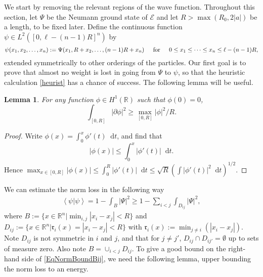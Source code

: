\documentclass[a4paper,11pt]{article}
\newcommand{\abs}[1]{\left\lvert #1 \right\rvert}
\renewcommand{\braket}[1]{\left\langle#1\right\rangle}
\newcommand*\diff{\mathop{}\!\mathrm{d}}
\newcommand{\R}{\mathbb{R}}
\newtheorem{lemma}[theorem]{Lemma}
\numberwithin{equation}{section}
\begin{document}
	We start by removing the relevant regions of the wave function. Throughout this section, let $ \Psi $ be the Neumann ground state of $\mathcal{E}$ and let $R>\max\left(R_0,2\abs{a}\right)$ be a length, to be fixed later. Define the continuous function $ \psi\in L^2([0,\ell-(n-1)R]^n) $ by
	\begin{equation}
	\label{defpsi}
	  \psi(x_1,x_2,\dots,x_n):=\Psi(x_1,R+x_2,\dots,(n-1)R+x_n)\hspace{0.4cm}\text{ for }\hspace{0.4cm}0\leq x_1\leq\dots\leq x_n\leq \ell-(n-1)R, 
	\end{equation}
	extended symmetrically to other orderings of the particles. 
	Our first goal is to prove that almost no weight is lost in going from $\Psi$ to $\psi$, so that the heuristic calculation \eqref{heurist} has a chance of success. The following lemma will be useful.
	\begin{lemma}
		For any function $ \phi\in H^1(\R) $ such that $ \phi(0)=0 $, \begin{equation}\label{EqSobolevIneq}
		\int_{[0,R]}\abs{\partial\phi}^2\geq \max_{[0,R]}\abs{\phi}^2/R.
		\end{equation}
	\end{lemma}
	\begin{proof}
		Write $ \phi(x)=\int_{0}^{x}\phi'(t)\diff t $, and find that \begin{equation}
		\abs{\phi(x)}\leq \int_{0}^{x}\abs{\phi'(t)}\diff t.
		\end{equation}
		Hence $ \max_{x\in[0,R]}\abs{\phi(x)}\leq \int_{0}^{R}\abs{\phi'(t)}\diff t\leq \sqrt{R}\left(\int\abs{\phi'(t)}^2\diff t\right)^{1/2}. $
	\end{proof}
	We can estimate the norm loss in the following way
	\begin{equation}\label{EqNormBoundBij}
	\begin{aligned}
	\braket{\psi|\psi}=1-\int_{B}\abs{\Psi}^2\geq 1-\sum_{i<j}\int_{D_{ij}}\abs{\Psi}^2,
	\end{aligned}
	\end{equation}
	where $ B:=\{x\in\R^n\vert \min_{i,j}\abs{x_i-x_j}<R \} $ and $ D_{ij}:=\{x\in\R^n \vert \mathfrak{r}_i(x)=\abs{x_i-x_j}<R \} $ with $ \mathfrak{r}_i(x):=\min_{j\neq i}(\abs{x_i-x_j}) $. Note $ D_{ij} $ is not symmetric in $ i$ and $j $, and that for $j\neq j'$, $ D_{ij}\cap D_{ij'}=\emptyset$ up to sets of measure zero. Also note $ B=\cup_{i<j}D_{ij} $.  To give a good bound on the right-hand side of \eqref{EqNormBoundBij}, we need the following lemma, upper bounding the norm loss to an energy. 
\end{document}
